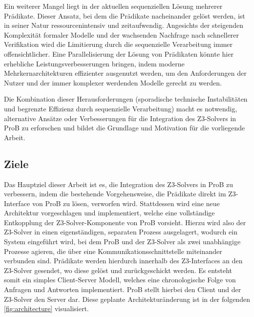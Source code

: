 Ein weiterer Mangel liegt in der aktuellen sequenziellen Lösung mehrerer Prädikate.
Dieser Ansatz, bei dem die Prädikate nacheinander gelöst werden,
ist in seiner Natur ressourcenintensiv und zeitaufwendig.
Angesichts der steigenden Komplexität formaler Modelle und der wachsenden Nachfrage nach schnellerer Verifikation wird die Limitierung durch die sequenzielle Verarbeitung immer offensichtlicher.
Eine Parallelisierung der Lösung von Prädikaten könnte hier erhebliche Leistungsverbesserungen bringen,
indem moderne Mehrkernarchitekturen effizienter ausgenutzt werden,
um den Anforderungen der Nutzer und der immer komplexer werdenden Modelle gerecht zu werden.

Die Kombination dieser Herausforderungen (sporadische technische Instabilitäten und begrenzte Effizienz durch sequenzielle Verarbeitung) macht es notwendig,
alternative Ansätze oder Verbesserungen für die Integration des Z3-Solvers in ProB zu erforschen und
bildet die Grundlage und Motivation für die vorliegende Arbeit.

\subsection{Ziele}
\label{sec:goals}

Das Hauptziel dieser Arbeit ist es, die Integration des Z3-Solvers in ProB zu verbessern,
indem die bestehende Vorgehensweise, die Prädikate direkt im Z3-Interface von ProB zu lösen, verworfen wird.
Stattdessen wird eine neue Architektur vorgeschlagen und implementiert,
welche eine vollständige Entkopplung der Z3-Solver-Komponente von ProB vorsieht.
Hierzu wird also der Z3-Solver in einen eigenständigen, separaten Prozess ausgelagert,
wodurch ein System eingeführt wird, bei dem ProB und der Z3-Solver als zwei unabhängige Prozesse agieren,
die über eine Kommunikationsschnittstelle miteinander verbunden sind.
Prädikate werden hierdurch innerhalb des Z3-Interfaces an den Z3-Solver gesendet, wo diese gelöst und zurückgeschickt werden.
Es entsteht somit ein simples Client-Server Modell, welches eine chronologische Folge von Anfragen und Antworten implementiert.
ProB stellt hierbei den Client und der Z3-Solver den Server dar.
Diese geplante Architekturänderung ist in der folgenden \cref{fig:architecture} visualisiert.
\newline

